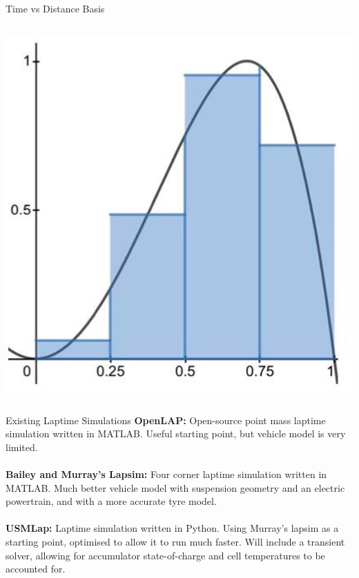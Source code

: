 \begin{frame}{Time vs Distance Basis}
\begin{columns}
        \includegraphics[width=\textwidth]{res/Midpoint Rule.png}
    \end{columns}
\end{frame}

\begin{frame}{Existing Laptime Simulations}
    \textbf{OpenLAP:}
    Open-source point mass laptime simulation written in MATLAB\@.
    Useful starting point, but vehicle model is very limited.
    \\~\\
    \textbf{Bailey and Murray's Lapsim:}
    Four corner laptime simulation written in MATLAB\@.
    Much better vehicle model
    with suspension geometry and an electric powertrain,
    and with a more accurate tyre model.
    \\~\\
    \textbf{USMLap:}
    Laptime simulation written in Python.
    Using Murray's lapsim as a starting point,
    optimised to allow it to run much faster.
    Will include a transient solver,
    allowing for accumulator state-of-charge
    and cell temperatures
    to be accounted for.
\end{frame}
